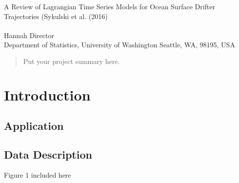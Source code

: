 \documentclass{stat572Style}
\begin{document}

\begin{center}
  {\LARGE A Review of Lagrangian Time Series Models for Ocean Surface Drifter Trajectories (Sykulski et al. (2016)}\\\ \\
  {Hannah Director \\ 
    Department of Statistics, University of Washington Seattle, WA, 98195, USA
  }
\end{center}



\begin{abstract}
  Put your project summary here.
\end{abstract}

\section{Introduction}
	\subsection{Application}
		\subsection{Data Description}
			Figure 1 included here 
	
			
\end{document}
